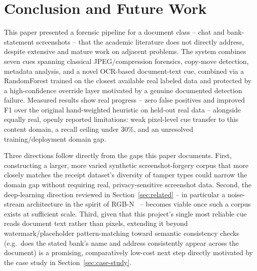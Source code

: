 \documentclass[conference]{IEEEtran}
\begin{document}
\section{Conclusion and Future Work}
\label{sec:conclusion}

This paper presented a forensic pipeline for a document class -- chat and
bank-statement screenshots -- that the academic literature does not directly
address, despite extensive and mature work on adjacent problems. The system
combines seven cues spanning classical JPEG/compression forensics, copy-move
detection, metadata analysis, and a novel OCR-based document-text cue,
combined via a RandomForest trained on the closest available real labeled
data and protected by a high-confidence override layer motivated by a
genuine documented detection failure. Measured results show real progress --
zero false positives and improved F1 over the original hand-weighted
heuristic on held-out real data -- alongside equally real, openly reported
limitations: weak pixel-level cue transfer to this content domain, a recall
ceiling under 30\%, and an unresolved training/deployment domain gap.

Three directions follow directly from the gaps this paper documents. First,
constructing a larger, more varied synthetic screenshot-forgery corpus that
more closely matches the receipt dataset's diversity of tamper types could
narrow the domain gap without requiring real, privacy-sensitive screenshot
data. Second, the deep-learning direction reviewed in
Section~\ref{sec:related} -- in particular a noise-stream architecture in the
spirit of RGB-N~\cite{zhou2018learning} -- becomes viable once such a corpus
exists at sufficient scale. Third, given that this project's single most
reliable cue reads document text rather than pixels, extending it beyond
watermark/placeholder pattern-matching toward semantic consistency checks
(e.g.\ does the stated bank's name and address consistently appear across the
document) is a promising, comparatively low-cost next step directly
motivated by the case study in Section~\ref{sec:case-study}.



\end{document}
